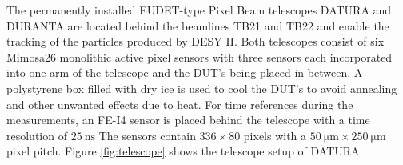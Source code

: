 The permanently installed EUDET-type Pixel Beam telescopes DATURA and DURANTA are located behind the beamlines TB21 and TB22 and enable the tracking of the particles
produced by DESY II. Both telescopes consist of six Mimosa26 monolithic active pixel sensors with %
three sensors each incorporated into one arm of the telescope and the DUT's being placed in between. A polystyrene box filled with dry ice is used to cool the DUT's to
avoid annealing and other unwanted effects due to heat. For time references during the measurements, an FE-I4 sensor is placed behind the telescope with a
time resolution of $\SI{25}{\nano\second}$ The sensors contain $336 \times 80$ pixels with a
$\SI{50}{\micro\meter} \times \SI{250}{\micro\meter}$ pixel pitch. Figure \ref{fig:telescope} shows the telescope setup of DATURA.


